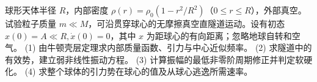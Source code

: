 球形天体半径 \(R\)，内部密度 \(\rho(r)=\rho_0(1-r^2/R^2)\)（\(0\le r\le R\)），外部真空。试验粒子质量 \(m\ll M\)，可沿贯穿球心的无摩擦真空直隧道运动。设有初态 \(x(0)=A\ll R,\dot x(0)=0\)，其中 \(x\) 为距球心的有向距离；忽略地球自转和空气。
(1) 由牛顿壳层定理求内部质量函数、引力与中心近似频率。
(2) 求隧道中的有效势，建立弱非线性振动方程。
(3) 计算振幅的最低非零阶周期修正并判定软硬化。
(4) 求整个球体的引力势在球心的值及从球心逃逸所需速率。
